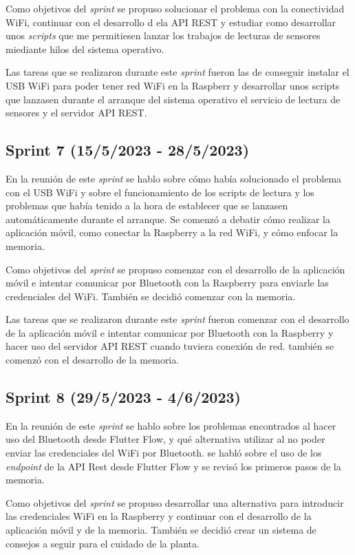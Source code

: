 Como objetivos del \textit{sprint} se propuso solucionar el problema con la conectividad WiFi, continuar con el desarrollo d ela API REST y estudiar como desarrollar unos \textit{scripts} que me permitiesen lanzar los trabajos de lecturas de sensores miediante hilos del sistema operativo.

Las tareas que se realizaron durante este \textit{sprint} fueron las de conseguir instalar el USB WiFi para poder tener red WiFi en la Raspberr y desarrollar unos scripts que lanzasen durante el arranque del sistema operativo el servicio de lectura de sensores y el servidor API REST.

\subsection{Sprint 7 (15/5/2023 - 28/5/2023)}
En la reunión de este \textit{sprint} se hablo sobre cómo había solucionado el problema con el USB WiFi y sobre el funcionamiento de los scripts de lectura y los problemas que había tenido a la hora de establecer que se lanzasen automáticamente durante el arranque. Se comenzó a debatir cómo realizar la aplicación móvil, como conectar la Raspberry a la red WiFi, y cómo enfocar la memoria.

Como objetivos del \textit{sprint} se propuso comenzar con el desarrollo de la aplicación móvil e intentar comunicar por Bluetooth con la Raspberry para enviarle las credenciales del WiFi. También se decidió comenzar con la memoria.

Las tareas que se realizaron durante este \textit{sprint} fueron comenzar con el desarrollo de la aplicación móvil e intentar comunicar por Bluetooth con la Raspberry y hacer uso del servidor API REST cuando tuviera conexión de red. también se comenzó con el desarrollo de la memoria.


\subsection{Sprint 8 (29/5/2023 - 4/6/2023)}
En la reunión de este \textit{sprint} se hablo sobre los problemas encontrados al hacer uso del Bluetooth desde Flutter Flow, y qué alternativa utilizar al no poder enviar las credenciales del WiFi por Bluetooth. se habló sobre el uso de los \textit{endpoint} de la API Rest desde Flutter Flow y se revisó los primeros pasos de la memoria.

Como objetivos del \textit{sprint} se propuso desarrollar una alternativa para introducir las credenciales WiFi en la Raspberry y continuar con el desarrollo de la aplicación móvil y de la memoria. También se decidió crear un sistema de consejos a seguir para el cuidado de la planta.

